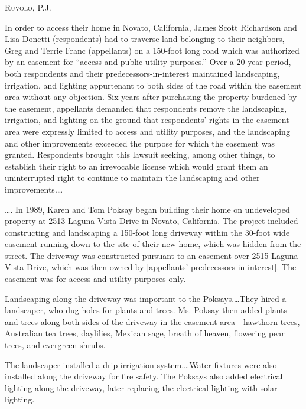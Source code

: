 

\opinion \textsc{Ruvolo}, P.J.

In order to access their home in Novato, California, James Scott Richardson and
Lisa Donetti (respondents) had to traverse land belonging to their neighbors,
Greg and Terrie Franc (appellants) on a 150-foot long road which was authorized
by an easement for ``access and public utility purposes.'' Over a 20-year
period, both respondents and their predecessors-in-interest maintained
landscaping, irrigation, and lighting appurtenant to both sides of the road
within the easement area without any objection. Six years after purchasing the
property burdened by the easement, appellants demanded that respondents remove
the landscaping, irrigation, and lighting on the ground that respondents' rights
in the easement area were expressly limited to access and utility purposes, and
the landscaping and other improvements exceeded the purpose for which the
easement was granted. Respondents brought this lawsuit seeking, among other
things, to establish their right to an irrevocable license which would grant
them an uninterrupted right to continue to maintain the landscaping and other
improvements.\ldots

\ldots. In 1989, Karen and Tom Poksay began building their home on undeveloped
property at 2513 Laguna Vista Drive in Novato, California. The project included
constructing and landscaping a 150-foot long driveway within the 30-foot wide
easement running down to the site of their new home, which was hidden from the
street. The driveway was constructed pursuant to an easement over 2515 Laguna
Vista Drive, which was then owned by [appellants' predecessors in interest]. The
easement was for access and utility purposes only.

Landscaping along the driveway was important to the Poksays.\ldots They hired a
landscaper, who dug holes for plants and trees. Ms. Poksay then added plants and
trees along both sides of the driveway in the easement area---hawthorn trees,
Australian tea trees, daylilies, Mexican sage, breath of heaven, flowering pear
trees, and evergreen shrubs.

The landscaper installed a drip irrigation system.\ldots Water fixtures were
also installed along the driveway for fire safety. The Poksays also added
electrical lighting along the driveway, later replacing the electrical lighting
with solar lighting.

